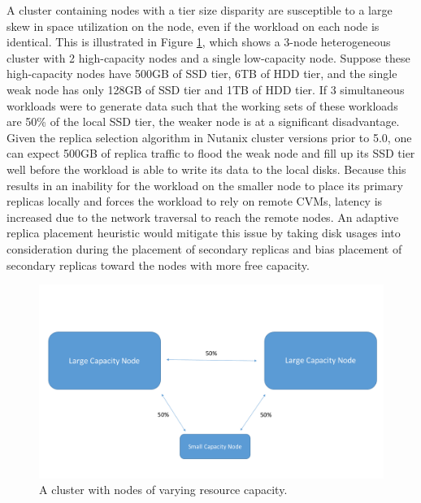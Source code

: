 \documentclass[12pt]{article}
\begin{document}
    A cluster containing nodes with a tier size disparity are susceptible to a
    large skew in space utilization on the node, even if the workload on each
    node is identical. This is illustrated in Figure
    \ref{fig:tier_size_disparity}, which shows a 3-node heterogeneous cluster
    with 2 high-capacity nodes and a single low-capacity node.  Suppose these
    high-capacity nodes have 500GB of SSD tier, 6TB of HDD tier, and the single
    weak node has only 128GB of SSD tier and 1TB of HDD tier. If 3 simultaneous
    workloads were to generate data such that the working sets of these
    workloads are 50\% of the local SSD tier, the weaker node is at a
    significant disadvantage. Given the replica selection algorithm in Nutanix
    cluster versions prior to 5.0, one can expect 500GB of replica traffic to
    flood the weak node and fill up its SSD tier well before the workload is
    able to write its data to the local disks.  Because this results in an
    inability for the workload on the smaller node to place its primary
    replicas locally and forces the workload to rely on remote CVMs, latency is
    increased due to the network traversal to reach the remote nodes. An
    adaptive replica placement heuristic would mitigate this issue by taking
    disk usages into consideration during the placement of secondary replicas
    and bias placement of secondary replicas toward the nodes with more free
    capacity.

    \begin{figure}[htbp]
      \centering
      \includegraphics[scale=0.45]{images/homogeneous_tier_disparity.pdf} 
      \caption{A cluster with nodes of varying resource capacity.}
      \label{fig:tier_size_disparity}
    \end{figure}
\FloatBarrier

\newpage
\end{document}
